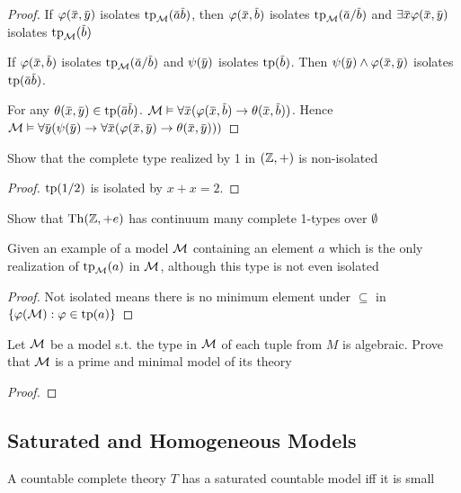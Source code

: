 \documentclass[11pt]{article}
\begin{document}
\begin{proof}
If \(\varphi(\barx,\bary)\) isolates \(\tp_{\calm}(\bara\barb)\), then \(\varphi(\barx,\barb)\)
isolates \(\tp_{\calm}(\bara/\barb)\) and \(\exists\barx\varphi(\barx,\bary)\) isolates \(\tp_{\calm}(\barb)\)

If \(\varphi(\barx,\barb)\) isolates \(\tp_{\calm}(\bara/\barb)\) and \(\psi(\bary)\)
isolates \(\tp(\barb)\). Then \(\psi(\bary)\wedge\varphi(\barx,\bary)\) isolates \(\tp(\bara\barb)\).

For any \(\theta(\barx,\bary)\in\tp(\bara\barb)\). \(\calm\vDash\forall\barx(\varphi(\barx,\barb)\to\theta(\barx,\barb))\).
Hence \(\calm\vDash\forall\bary(\psi(\bary)\to\forall\barx(\varphi(\barx,\bary)\to\theta(\barx,\bary)))\)
\end{proof}

\begin{exercise}
Show that the complete type realized by 1 in \((\mathbb{Z},+)\) is non-isolated
\end{exercise}

\begin{proof}
\(\operatorname{tp}(1/2)\) is isolated by \(x+x=2\).
\end{proof}

\begin{exercise}
\label{ex2.1.6}
Show that \(\operatorname{Th}(\mathbb{Z},+e)\) has continuum many complete 1-types over \(\emptyset\)
\end{exercise}

\begin{exercise}
\label{ex2.1.7}
Given an example of a model \(\mathcal{M}\) containing an element \(a\) which is the only realization
of \(\operatorname{tp}_{\mathcal{M}}(a)\) in \(\mathcal{M}\), although this type is not even isolated
\end{exercise}

\begin{proof}
Not isolated means there is no minimum element under \(\subseteq\) in \(\{\varphi(\mathcal{M}):\varphi\in\operatorname{tp}(a)\}\)
\end{proof}

\begin{exercise}
\label{ex2.1.8}
Let \(\mathcal{M}\) be a model s.t. the type in \(\mathcal{M}\) of each tuple from \(M\) is algebraic. Prove
that \(\mathcal{M}\) is a prime and minimal model of its theory
\end{exercise}

\begin{proof}

\end{proof}
\subsection{Saturated and Homogeneous Models}
\label{sec:orgc93f404}
\begin{proposition}[]
A countable complete theory \(T\) has a saturated countable model iff it is small
\end{proposition}
\end{document}
